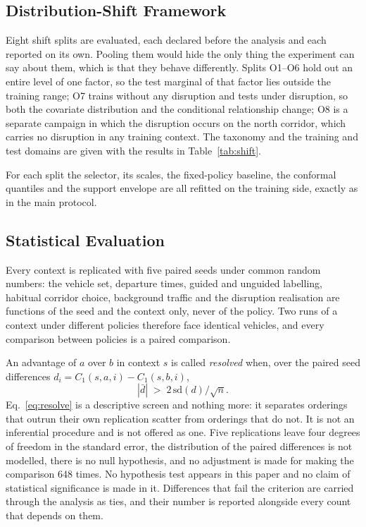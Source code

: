 \documentclass[preprint,12pt]{elsarticle}
\begin{document}
\subsection{Distribution-Shift Framework}
\label{sec:method:shift}

Eight shift splits are evaluated, each declared before the analysis and each
reported on its own. Pooling them would hide the only thing the experiment can
say about them, which is that they behave differently. Splits O1--O6 hold out an
entire level of one factor, so the test marginal of that factor lies outside the
training range; O7 trains without any disruption and tests under disruption, so
both the covariate distribution and the conditional relationship change; O8 is a
separate campaign in which the disruption occurs on the north corridor, which
carries no disruption in any training context. The taxonomy and the training and
test domains are given with the results in Table~\ref{tab:shift}.

For each split the selector, its scales, the fixed-policy baseline, the conformal
quantiles and the support envelope are all refitted on the training side, exactly
as in the main protocol.

\subsection{Statistical Evaluation}
\label{sec:method:stats}

Every context is replicated with five paired seeds under common random numbers:
the vehicle set, departure times, guided and unguided labelling, habitual
corridor choice, background traffic and the disruption realisation are functions
of the seed and the context only, never of the policy. Two runs of a context
under different policies therefore face identical vehicles, and every comparison
between policies is a paired comparison.

An advantage of $a$ over $b$ in context $s$ is called \emph{resolved} when, over
the paired seed differences $d_i = C_1(s,a,i) - C_1(s,b,i)$,
\begin{equation}
|\bar d| \;>\; 2\, \mathrm{sd}(d)/\sqrt{n}.
\label{eq:resolve}
\end{equation}
Eq.~\eqref{eq:resolve} is a descriptive screen and nothing more: it separates
orderings that outrun their own replication scatter from orderings that do not.
It is not an inferential procedure and is not offered as one. Five replications
leave four degrees of freedom in the standard error, the distribution of the
paired differences is not modelled, there is no null hypothesis, and no
adjustment is made for making the comparison 648 times. No hypothesis test appears in this
paper and no claim of statistical significance is made in it. Differences that
fail the criterion are carried through the analysis as ties, and their number is
reported alongside every count that depends on them.
\end{document}
